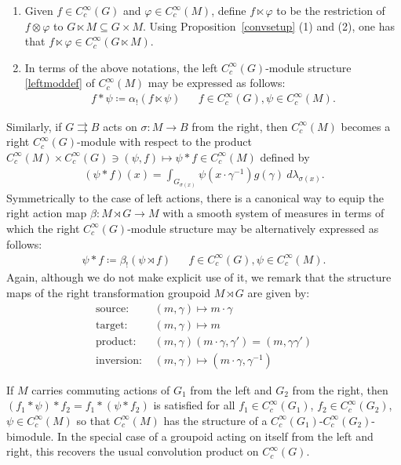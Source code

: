 \documentclass[12pt]{article}
\theoremstyle{plain}
\theoremstyle{definition}
\numberwithin{equation}{section}
\begin{document}
\begin{enumerate}
\item Given $f \in C_c^\infty(G)$ and $\varphi \in C_c^\infty(M)$, define $f\ltimes \varphi$ to be the restriction of $f \otimes \varphi$ to $G\ltimes M \subseteq G\times M$. 
Using  Proposition~\ref{convsetup} (1) and (2), one has that $f \ltimes \varphi \in C_c^\infty(G\ltimes M)$.

\item In terms of the above notations, the left $C_c^\infty(G)$-module structure \eqref{leftmoddef} of $C_c^\infty(M)$ may be expressed as follows:
\begin{align}\label{abstractconvsetup}
f * \psi \coloneqq \alpha_!( f \ltimes \psi ) && f \in C_c^\infty(G), \psi \in C_c^\infty(M).
\end{align}
\end{enumerate}



Similarly, if $G\rightrightarrows B$ acts on $\sigma:M \to B$ from the right, then $C_c^\infty(M)$ becomes a right $C_c^\infty(G)$-module with respect to the product $C_c^\infty(M) \times C_c^\infty(G) \ni (\psi,f) \mapsto \psi * f \in C_c^\infty(M)$ defined by
\begin{align}\label{rightmoddef}
(\psi * f)(x) = \int_{G_{\sigma(x)}} \psi( x \cdot \gamma^{-1}) g (\gamma) \ d\lambda_{\sigma(x)}.
\end{align}
Symmetrically  to the case of left actions, there is a canonical way to equip the right action map $\beta : M \rtimes G \to M$ with a smooth system of measures in terms of which the right $C_c^\infty(G)$-module structure may be alternatively expressed as follows:
\begin{align}\label{abstractrightmoddef}
\psi * f \coloneqq \beta_!( \psi \rtimes f ) && f \in C_c^\infty(G), \psi \in C_c^\infty(M). 
\end{align}
Again, although we do not make explicit use of it, we remark that the structure maps of the right transformation groupoid $M \rtimes G$  are given by:
\begin{align*}
\text{source: } &(m,\gamma) \mapsto m \cdot \gamma \\
\text{target: } &(m,\gamma) \mapsto m \\
\text{product: } &(m,\gamma) (m \cdot \gamma,\gamma') = (m,\gamma\gamma')\\
\text{inversion: } &(m,\gamma)   \mapsto (m\cdot\gamma,\gamma^{-1})
\end{align*}



If $M$ carries commuting actions of $G_1$ from the left and $G_2$ from the right, then $(f_1 * \psi)*f_2 = f_1 * (\psi * f_2)$ is satisfied for all $f_1 \in C_c^\infty(G_1)$, $f_2\in C_c^\infty(G_2)$, $\psi \in C_c^\infty(M)$ so that $C_c^\infty(M)$ has the structure of a $C_c^\infty(G_1)$-$C_c^\infty(G_2)$-bimodule. In the special case of a groupoid acting on itself from the left and right, this recovers the usual convolution product on $C_c^\infty(G)$.
\end{document}
